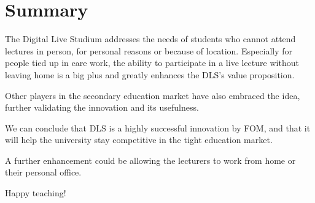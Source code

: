 %
%

\pagebreak
\section{Summary}

\onehalfspacing

The Digital Live Studium addresses the needs of students who cannot attend lectures in person, for personal reasons or because of location. Especially for people tied up in care work, the ability to participate in a live lecture without leaving home is a big plus and greatly enhances the DLS's value proposition.

Other players in the secondary education market have also embraced the idea, further validating the innovation and its usefulness.

We can conclude that DLS is a highly successful innovation by FOM, and that it will help the university stay competitive in the tight education market.

A further enhancement could be allowing the lecturers to work from home or their personal office.

Happy teaching!
